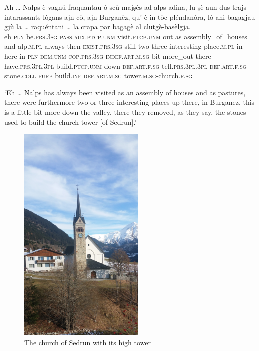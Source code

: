 \begin{linenumbers}
\gll Ah … Nalps è vagnú fraquantau ò scù majṣès ad alps adina, lu ṣè aun dus trajs intarassants lògans ajn cò, ajn Burganèz, qu' è in tòc pléndanòra, lò ani bagagjau gjù la … raquéntani … la crapa par bagagè al clutgè-basèlgja.\\
eh {}  \textsc{pln}  be.\textsc{prs.3sg} \textsc{pass.aux.ptcp.unm} visit.\textsc{ptcp.unm} out as assembly\_of\_houses and alp.\textsc{m.pl} always then \textsc{exist.prs.3sg} still two three interesting place.\textsc{m.pl} in here in \textsc{pln} \textsc{dem.unm} \textsc{cop.prs.3sg} \textsc{indef.art.m.sg} bit more\_out there have.\textsc{prs.3pl.3pl} build.\textsc{ptcp.unm} down \textsc{def.art.f.sg} {} tell.\textsc{prs.3pl.3pl} {} \textsc{def.art.f.sg} stone.\textsc{coll} \textsc{purp} build.\textsc{inf}  \textsc{def.art.m.sg} tower.\textsc{m.sg}-church.\textsc{f.sg}  \\
\end{linenumbers}
\medskip
\glt `Eh … Nalps has always been visited as an assembly of houses and as pastures, there were furthermore two or three interesting places up there, in Burganez, this is a little bit more down the valley, there they removed, as they say, the stones used to build the church tower [of Sedrun].'
\medskip

\begin{figure}
	\includegraphics[angle=360,width=
	60mm]{figures/Baselgia da Sedrun.jpg}
	\caption{The church of Sedrun with its high tower}
\end{figure}


